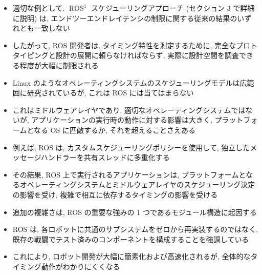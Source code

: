 \begin{frame}{}
    \begin{itemize}
        \item 適切な例として, $\operatorname{ROS}^{1}$ スケジューリングアプローチ (セクション 3 で詳細に説明) は, エンドツーエンドレイテンシの制限に関する従来の結果のいずれとも一致しない
        \item したがって, ROS 開発者は, タイミング特性を測定するために, 完全なプロトタイピングと設計の展開に頼らなければならず, 実際に設計空間を調査できる程度が大幅に制限される
    \end{itemize}
\end{frame}


\begin{frame}{}
    \begin{itemize}
        \item Linux のようなオペレーティングシステムのスケジューリングモデルは広範囲に研究されているが, これは ROS には当てはまらない
        \item これはミドルウェアレイヤであり, 適切なオペレーティングシステムではないが, アプリケーションの実行時の動作に対する影響は大きく, プラットフォームとなる OS に匹敵するか, それを超えることさえある
        \item 例えば, ROS は, カスタムスケジューリングポリシーを使用して, 独立したメッセージハンドラーを共有スレッドに多重化する
        \item その結果, ROS 上で実行されるアプリケーションは, プラットフォームとなるオペレーティングシステムとミドルウェアレイヤのスケジューリング決定の影響を受け, 複雑で相互に依存するタイミングの影響を受ける
    \end{itemize}
\end{frame}

\begin{frame}{}
    \begin{itemize}
        \item 追加の複雑さは, ROS の重要な強みの 1 つであるモジュール構造に起因する
        \item ROS は, 各ロボットに共通のサブシステムをゼロから再実装するのではなく, 既存の戦闘でテスト済みのコンポーネントを構成することを強調している
        \item これにより, ロボット開発が大幅に簡素化および高速化されるが, 全体的なタイミング動作がわかりにくくなる
    \end{itemize}
\end{frame}

